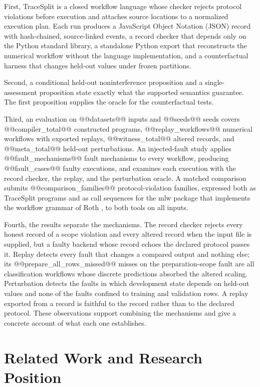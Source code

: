 \documentclass[lettersize,journal]{IEEEtran}
\newcommand{\tool}{TraceSplit}
\begin{document}
First, \tool{} is a closed workflow language whose checker rejects protocol violations before execution and attaches source locations to a normalized execution plan. Each run produces a JavaScript Object Notation (JSON) record with hash-chained, source-linked events, a record checker that depends only on the Python standard library, a standalone Python export that reconstructs the numerical workflow without the language implementation, and a counterfactual harness that changes held-out values under frozen partitions.

Second, a conditional held-out noninterference proposition and a single-assessment proposition state exactly what the supported semantics guarantee. The first proposition supplies the oracle for the counterfactual tests.

Third, an evaluation on @@datasets@@ inputs and @@seeds@@ seeds covers @@compiler_total@@ constructed programs, @@replay_workflows@@ numerical workflows with exported replays, @@witness_total@@ altered records, and @@meta_total@@ held-out perturbations. An injected-fault study applies @@fault_mechanisms@@ fault mechanisms to every workflow, producing @@fault_cases@@ faulty executions, and examines each execution with the record checker, the replay, and the perturbation oracle. A matched comparison submits @@comparison_families@@ protocol-violation families, expressed both as \tool{} programs and as call sequences for the mlw package that implements the workflow grammar of Roth \cite{roth2026,mlw2026}, to both tools on all inputs.

Fourth, the results separate the mechanisms. The record checker rejects every honest record of a scope violation and every altered record when the input file is supplied, but a faulty backend whose record echoes the declared protocol passes it. Replay detects every fault that changes a compared output and nothing else; its @@prepare_all_rows_missed@@ misses on the preparation-scope fault are all classification workflows whose discrete predictions absorbed the altered scaling. Perturbation detects the faults in which development state depends on held-out values and none of the faults confined to training and validation rows. A replay exported from a record is faithful to the record rather than to the declared protocol. These observations support combining the mechanisms and give a concrete account of what each one establishes.

\section{Related Work and Research Position}
\end{document}

